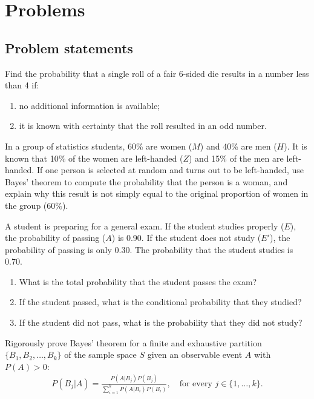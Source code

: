 \section*{Problems}

\subsection*{Problem statements}

\begin{problema}
	\label{prob:054ed26}
	Find the probability that a single roll of a fair 6-sided die results in a number less than 4 if:
	\begin{enumerate}
		\item no additional information is available;
		\item it is known with certainty that the roll resulted in an odd number.
	\end{enumerate}
\end{problema}

\begin{problema}
	\label{prob:bde7784}
	In a group of statistics students, 60\% are women ($M$) and 40\% are men ($H$). It is known that 10\% of the women are left-handed ($Z$) and 15\% of the men are left-handed. If one person is selected at random and turns out to be left-handed, use Bayes' theorem to compute the probability that the person is a woman, and explain why this result is not simply equal to the original proportion of women in the group ($60\%$).
\end{problema}

\begin{problema}
	\label{prob:e14faa0}
	A student is preparing for a general exam. If the student studies properly ($E$), the probability of passing ($A$) is 0.90. If the student does not study ($E'$), the probability of passing is only 0.30. The probability that the student studies is 0.70.
	\begin{enumerate}
		\item What is the total probability that the student passes the exam?
		\item If the student passed, what is the conditional probability that they studied?
		\item If the student did not pass, what is the probability that they did not study?
	\end{enumerate}
\end{problema}

\begin{problema}
	\label{prob:a7e87e4}
	Rigorously prove Bayes' theorem for a finite and exhaustive partition $\{B_1, B_2, \dots, B_k\}$ of the sample space $S$ given an observable event $A$ with $P(A)>0$:
	\begin{align}
		P(B_j | A) = \frac{P(A|B_j)P(B_j)}{\sum_{i=1}^k P(A|B_i)P(B_i)}, \quad \text{for every } j \in \{1, \dots, k\}.
	\end{align}
\end{problema}

